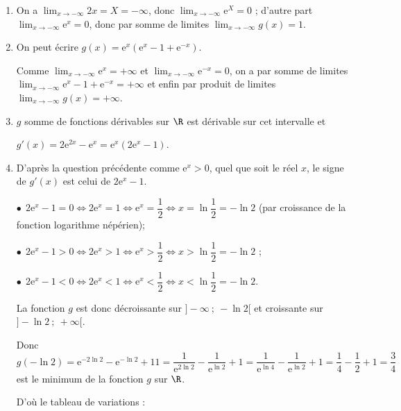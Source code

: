 \begin{enumerate}
\item %
On a $\displaystyle\lim_{x \to - \infty}2x = X = - \infty$, donc $\displaystyle\lim_{x \to - \infty}\text{e}^X = 0$ ; d'autre part $\displaystyle\lim_{x \to - \infty}\text{e}^x = 0$, donc par somme de limites $\displaystyle\lim_{x \to - \infty}g(x) = 1$.
\item %
On peut écrire $g(x) = \text{e}^x \left(\text{e}^x - 1 + \text{e}^{-x} \right)$.

Comme $\displaystyle\lim_{x \to - \infty}\text{e}^x = + \infty$ et $\displaystyle\lim_{x \to - \infty}\text{e}^{-x} = 0$, on a par somme de limites $\displaystyle\lim_{x \to - \infty}\text{e}^x - 1 + \text{e}^{-x}  = + \infty$ et enfin par produit de limites $\displaystyle\lim_{x \to - \infty}g(x) = + \infty$.
\item %
$g$ somme de fonctions dérivables sur $\R$ est dérivable sur cet intervalle et 

$g'(x) = 2\text{e}^{2x} - \text{e}^{x} = \text{e}^{x}\left(2\text{e}^{x} - 1\right)$.
\item %
D'après la question précédente comme $\text{e}^{x} > 0$, quel que soit le réel $x$, le signe de $g'(x)$ est celui de $2\text{e}^{x} - 1$.

$\bullet~~$$2\text{e}^{x} - 1 = 0 \iff 2\text{e}^{x} = 1 \iff \text{e}^{x} = \dfrac12 \iff x = \ln \dfrac12 = - \ln 2$  (par croissance de la fonction logarithme népérien);

$\bullet~~$$2\text{e}^{x} - 1 > 0 \iff 2\text{e}^{x} > 1 \iff \text{e}^{x} >\dfrac12 \iff x > \ln \dfrac12 =- \ln 2$ ;

$\bullet~~$$2\text{e}^{x} - 1 < 0 \iff 2\text{e}^{x} < 1 \iff \text{e}^{x} < \dfrac12 \iff x < \ln \dfrac12 = - \ln 2$.

La fonction $g$ est donc décroissante sur $]- \infty~;~- \ln 2[$ et croissante sur $]- \ln 2~;~+\infty[$.

Donc $g(- \ln 2) = \text{e}^{-2\ln 2} - \text{e}^{- \ln 2} + 1 1 = \dfrac{1}{\text{e}^{2\ln 2}} - \dfrac{1}{\text{e}^{\ln 2}} + 1 = \dfrac{1}{\text{e}^{\ln 4}} - \dfrac{1}{\text{e}^{\ln 2}} + 1 = \dfrac14 - \dfrac12 + 1 = \dfrac34$ est le minimum de la fonction $g$ sur $\R$.

D'où le tableau de variations :


\end{enumerate}
